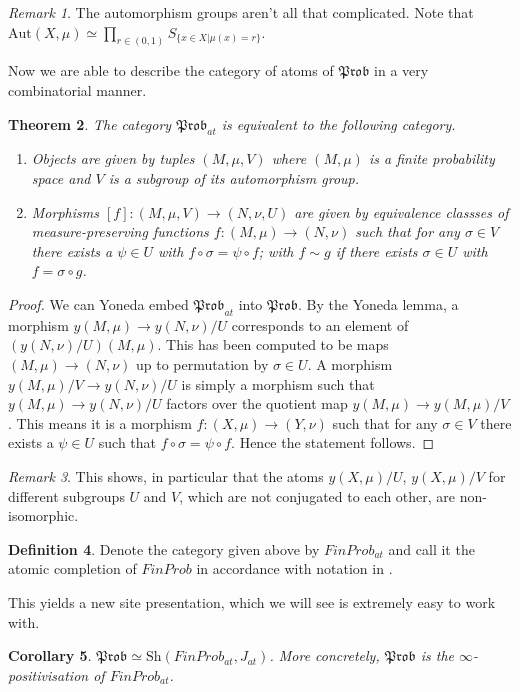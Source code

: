 \documentclass[a4paper]{amsproc}
\theoremstyle{plain}
\newtheorem{theorem}{Theorem}[section]
\newtheorem{corollary}[theorem]{Corollary}
\theoremstyle{definition}
\newtheorem{definition}[theorem]{Definition}
\theoremstyle{remark}
\newtheorem{remark}[theorem]{Remark}
\numberwithin{equation}{section}
\begin{document}
\begin{remark} The automorphism groups aren't all that complicated. Note that $\text{Aut}(X,\mu)\simeq \prod_{r\in (0,1)} S_{\{x\in X| \mu(x)=r \}}$.
\end{remark}

Now we are able to describe the category of atoms of $\mathfrak{Prob}$ in a very combinatorial manner. 

\begin{theorem} The category $\mathfrak{Prob}_{at}$ is equivalent to the following category. \begin{enumerate}
\item Objects are given by tuples $(M,\mu, V)$ where $(M,\mu)$ is a finite probability space and $V$ is a subgroup of its automorphism group. 
\item Morphisms $[f]:(M,\mu, V)\rightarrow (N,\nu, U)$ are given by equivalence classses of measure-preserving functions $f:(M,\mu)\rightarrow (N,\nu)$ such that for any $\sigma\in V$ there exists a $\psi\in U$ with $f\circ \sigma =\psi\circ f $; with $f\sim g$ if there exists $\sigma\in U$ with $f=\sigma\circ g$.
\end{enumerate}
\end{theorem}
\begin{proof}
We can Yoneda embed $\mathfrak{Prob}_{at}$ into $\mathfrak{Prob}$.  By the Yoneda lemma, a morphism $y(M,\mu)\rightarrow y(N,\nu)/U$ corresponds to an element of $(y(N,\nu)/U)(M,\mu)$. This has been computed to be maps $(M,\mu)\rightarrow (N,\nu)$ up to permutation by $\sigma\in U$. A morphism $y(M,\mu)/V \rightarrow y(N,\nu)/U$ is simply a morphism such that $y(M,\mu)\rightarrow y(N,\nu)/U$ factors over the quotient map $y(M,\mu)\rightarrow y(M,\mu)/V$. This means it is a morphism $f:(X,\mu)\rightarrow (Y,\nu)$ such that for any $\sigma\in V$ there exists a $\psi\in U$ such that $f\circ \sigma =\psi\circ f $. Hence the statement follows.
\end{proof}

\begin{remark} This shows, in particular that the atoms $y(X,\mu)/U$, $y(X,\mu)/V$ for different subgroups $U$ and $V$, which are not conjugated to each other, are non-isomorphic. %
\end{remark}

\begin{definition} Denote the category given above by $FinProb_{at}$ and call it the atomic completion of $FinProb$ in accordance with notation in \cite{caramello_lafforgue}.
\end{definition}
This yields a new site presentation, which we will see is extremely easy to work with.
\begin{corollary} \label{coprod_representation}
    $\mathfrak{Prob}\simeq \text{Sh}(FinProb_{at},J_{at})$. More concretely, $\mathfrak{Prob}$ is the $\infty$-positivisation of $FinProb_{at}$. %
\end{corollary}
\end{document}
